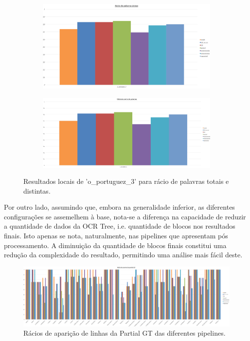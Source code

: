 \begin{figure}[H]
	\centering
	\begin{subfigure}{.5\textwidth}
		\centering
		\includegraphics[width=\linewidth]{images/resultados/local_example_gt_unique_word_hit_ratio_1.png}
	\end{subfigure}%
	\begin{subfigure}{.5\textwidth}
		\centering
		\includegraphics[width=\linewidth]{images/resultados/local_example_gt_word_hit_ratio_1.png}
	\end{subfigure}
	
	\caption{Resultados locais de 'o\_portuguez\_3' para rácio de palavras totais e distintas.}
	\label{fig:local_example_1}
\end{figure}


Por outro lado, assumindo que, embora na generalidade inferior, as diferentes configurações se assemelhem à base, nota-se a diferença na capacidade de reduzir a quantidade de dados da OCR Tree, i.e. quantidade de blocos nos resultados finais. Isto apenas se nota, naturalmente, nas pipelines que apresentam pós processamento. A diminuição da quantidade de blocos finais constitui uma redução da complexidade do resultado, permitindo uma análise mais fácil deste.



\begin{figure}[H]
	\centering
	\hspace*{-2cm}
	\includegraphics[width=1.25\textwidth]{images/resultados/graph_pgt_hit_ratio.png}
	\caption{Rácios de aparição de linhas da Partial GT das diferentes pipelines.}
	\label{fig:graph_pgt_hit_ratio}
\end{figure}


